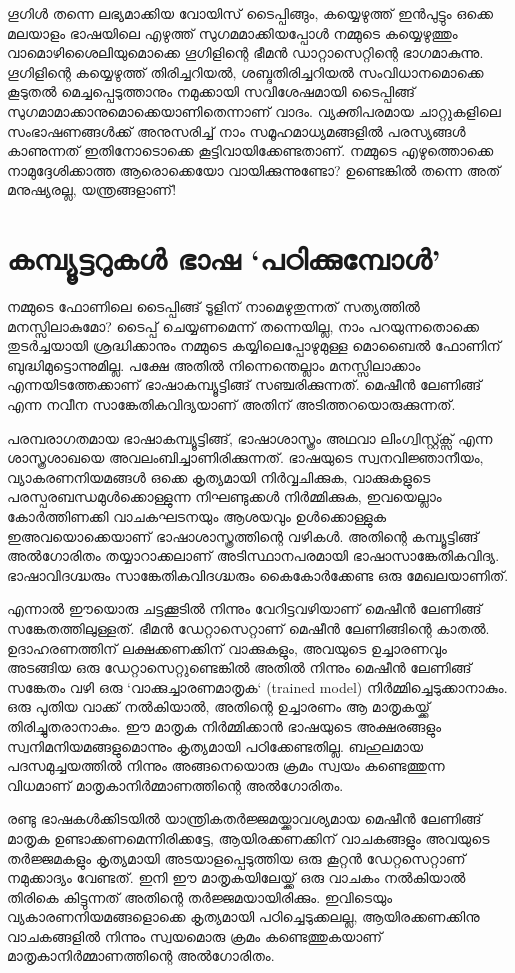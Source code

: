 \documentclass[12pt,twoside,a4paper]{article}
\begin{document}
ഗൂഗിൾ തന്നെ ലഭ്യമാക്കിയ വോയിസ് ടൈപ്പിങ്ങും, കയ്യെഴുത്ത് ഇൻപുട്ടും ഒക്കെ മലയാളം ഭാഷയിലെ എഴുത്ത് സുഗമമാക്കിയപ്പോൾ നമ്മുടെ കയ്യെഴുത്തും വാമൊഴിശൈലിയുമൊക്കെ ഗൂഗിളിന്റെ ഭീമൻ ഡാറ്റാസെറ്റിന്റെ ഭാഗമാകുന്നു. ഗൂഗിളിന്റെ കയ്യെഴുത്ത് തിരിച്ചറിയൽ, ശബ്ദതിരിച്ചറിയൽ സംവിധാനമൊക്കെ കൂടുതൽ മെച്ചപ്പെടുത്താനും നമുക്കായി സവിശേഷമായി ടൈപ്പിങ്ങ് സുഗമാമാക്കാനുമൊക്കെയാണിതെന്നാണ് വാദം. വ്യക്തിപരമായ ചാറ്റുകളിലെ സംഭാഷണങ്ങൾക്ക് അനുസരിച്ച് നാം സമൂഹമാധ്യമങ്ങളിൽ പരസ്യങ്ങൾ  കാണുന്നത് ഇതിനോടൊക്കെ കൂട്ടിവായിക്കേണ്ടതാണ്. നമ്മുടെ എഴുത്തൊക്കെ നാമുദ്ദേശിക്കാത്ത ആരൊക്കെയോ വായിക്കുന്നുണ്ടോ? ഉണ്ടെങ്കിൽ തന്നെ അത് മനുഷ്യരല്ല, യന്ത്രങ്ങളാണ്!

\section{കമ്പ്യൂട്ടറുകൾ ഭാഷ `പഠിക്കുമ്പോൾ'}

നമ്മുടെ ഫോണിലെ ടൈപ്പിങ്ങ് ടൂളിന് നാമെഴുതുന്നത്  സത്യത്തിൽ മനസ്സിലാകുമോ?  ടൈപ്പ് ചെയ്യണമെന്ന് തന്നെയില്ല, നാം പറയുന്നതൊക്കെ തുടർച്ചയായി ശ്രദ്ധിക്കാനും നമ്മുടെ കയ്യിലെപ്പോഴുമുള്ള മൊബൈൽ ഫോണിന് ബുദ്ധിമുട്ടൊന്നുമില്ല. പക്ഷേ അതിൽ നിന്നെന്തെല്ലാം മനസ്സിലാക്കാം എന്നയിടത്തേക്കാണ് ഭാഷാകമ്പ്യൂട്ടിങ്ങ് സഞ്ചരിക്കുന്നത്. മെഷീൻ ലേണിങ്ങ് എന്ന നവീന സാങ്കേതികവിദ്യയാണ് അതിന് അടിത്തറയൊരുക്കുന്നത്.

പരമ്പരാഗതമായ ഭാഷാകമ്പ്യൂട്ടിങ്ങ്, ഭാഷാശാസ്ത്രം അഥവാ ലിംഗ്വിസ്റ്റ്ക്സ് എന്ന ശാസ്ത്രശാഖയെ അവലംബിച്ചാണിരിക്കുന്നത്. ഭാഷയുടെ സ്വനവിജ്ഞാനീയം, വ്യാകരണനിയമങ്ങൾ ഒക്കെ കൃത്യമായി നിർവ്വചിക്കുക, വാക്കുകളുടെ പരസ്പരബന്ധമുൾക്കൊള്ളുന്ന നിഘണ്ടുക്കൾ നിർമ്മിക്കുക, ഇവയെല്ലാം കോർത്തിണക്കി വാചകഘടനയും ആശയവും ഉൾക്കൊള്ളുക ഇഅവയൊക്കെയാണ് ഭാഷാശാസ്ത്രത്തിന്റെ വഴികൾ. അതിന്റെ കമ്പ്യൂട്ടിങ്ങ് അൽഗോരിതം തയ്യാറാക്കലാണ് അടിസ്ഥാനപരമായി ഭാഷാസാങ്കേതികവിദ്യ. ഭാഷാവിദഗ്ദ്ധരും സാങ്കേതികവിദഗ്ദ്ധരും കൈകോർക്കേണ്ട ഒരു മേഖലയാണിത്.

എന്നാൽ ഈയൊരു ചട്ടക്കൂടിൽ നിന്നും വേറിട്ടവഴിയാണ് മെഷീൻ ലേണിങ്ങ് സങ്കേതത്തിലുള്ളത്. ഭീമൻ ഡേറ്റാസെറ്റാണ് മെഷീൻ ലേണിങ്ങിന്റെ കാതൽ. ഉദാഹരണത്തിന് ലക്ഷക്കണക്കിന് വാക്കുകളും, അവയുടെ ഉച്ചാരണവും അടങ്ങിയ ഒരു ഡേറ്റാസെറ്റുണ്ടെങ്കിൽ അതിൽ നിന്നും മെഷീൻ ലേണിങ്ങ് സങ്കേതം വഴി ഒരു `വാക്കുച്ചാരണമാതൃക` (trained model) നിർമ്മിച്ചെടുക്കാനാകും. ഒരു പുതിയ വാക്ക് നൽകിയാൽ, അതിന്റെ ഉച്ചാരണം ആ മാതൃകയ്ക്ക് തിരിച്ചുതരാനാകും. ഈ മാതൃക നിർമ്മിക്കാൻ ഭാഷയുടെ അക്ഷരങ്ങളും സ്വനിമനിയമങ്ങളുമൊന്നും കൃത്യമായി പഠിക്കേണ്ടതില്ല. ബഹുലമായ പദസമുച്ചയത്തിൽ നിന്നും അങ്ങനെയൊരു ക്രമം സ്വയം കണ്ടെത്തുന്ന വിധമാണ് മാതൃകാനിർമ്മാണത്തിന്റെ അൽഗോരിതം.

രണ്ടു ഭാഷകൾക്കിടയിൽ യാന്ത്രികതർജ്ജമയ്ക്കാവശ്യമായ മെഷീൻ ലേണിങ്ങ് മാതൃക ഉണ്ടാക്കണമെന്നിരിക്കട്ടേ, ആയിരക്കണക്കിന് വാചകങ്ങളും അവയുടെ തർജ്ജമകളും കൃത്യമായി അടയാളപ്പെടുത്തിയ ഒരു കൂറ്റൻ ഡേറ്റസെറ്റാണ് നമുക്കാദ്യം വേണ്ടത്. ഇനി ഈ മാതൃകയിലേയ്ക്ക്  ഒരു വാചകം നൽകിയാൽ തിരികെ കിട്ടുന്നത് അതിന്റെ തർജ്ജമയായിരിക്കും. ഇവിടെയും വ്യകാരണനിയമങ്ങളൊക്കെ കൃത്യമായി പഠിച്ചെടുക്കലല്ല, ആയിരക്കണക്കിനു വാചകങ്ങളിൽ നിന്നും സ്വയമൊരു ക്രമം കണ്ടെത്തുകയാണ് മാതൃകാനിർമ്മാണത്തിന്റെ അൽഗോരിതം.
\end{document}
